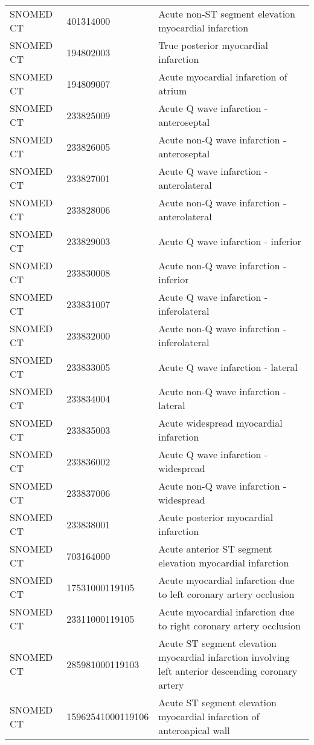 \begin{longtable}{p{}p{}p{}}
  SNOMED CT & 401314000 & Acute non-ST segment elevation myocardial infarction \\ 
  SNOMED CT & 194802003 & True posterior myocardial infarction \\ 
  SNOMED CT & 194809007 & Acute myocardial infarction of atrium \\ 
  SNOMED CT & 233825009 & Acute Q wave infarction - anteroseptal \\ 
  SNOMED CT & 233826005 & Acute non-Q wave infarction - anteroseptal \\ 
  SNOMED CT & 233827001 & Acute Q wave infarction - anterolateral \\ 
  SNOMED CT & 233828006 & Acute non-Q wave infarction - anterolateral \\ 
  SNOMED CT & 233829003 & Acute Q wave infarction - inferior \\ 
  SNOMED CT & 233830008 & Acute non-Q wave infarction - inferior \\ 
  SNOMED CT & 233831007 & Acute Q wave infarction - inferolateral \\ 
  SNOMED CT & 233832000 & Acute non-Q wave infarction - inferolateral \\ 
  SNOMED CT & 233833005 & Acute Q wave infarction - lateral \\ 
  SNOMED CT & 233834004 & Acute non-Q wave infarction - lateral \\ 
  SNOMED CT & 233835003 & Acute widespread myocardial infarction \\ 
  SNOMED CT & 233836002 & Acute Q wave infarction - widespread \\ 
  SNOMED CT & 233837006 & Acute non-Q wave infarction - widespread \\ 
  SNOMED CT & 233838001 & Acute posterior myocardial infarction \\ 
  SNOMED CT & 703164000 & Acute anterior ST segment elevation myocardial infarction \\ 
  SNOMED CT & 17531000119105 & Acute myocardial infarction due to left coronary artery occlusion \\ 
  SNOMED CT & 23311000119105 & Acute myocardial infarction due to right coronary artery occlusion \\ 
  SNOMED CT & 285981000119103 & Acute ST segment elevation myocardial infarction involving left anterior descending coronary artery \\ 
  SNOMED CT & 15962541000119106 & Acute ST segment elevation myocardial infarction of anteroapical wall \\ 

\end{longtable}

